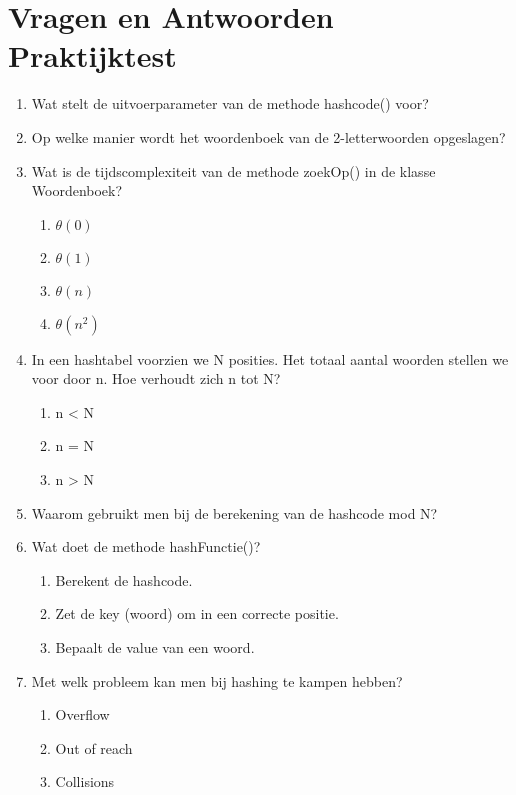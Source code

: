 
\chapter{Vragen en Antwoorden Praktijktest}
\label{ch:qenapraktijk}

\begin{enumerate}
	\item Wat stelt de uitvoerparameter van de methode  hashcode() voor?
	\item Op welke manier wordt het woordenboek van de 2-letterwoorden opgeslagen?
	\item Wat is de tijdscomplexiteit van de methode zoekOp() in de klasse Woordenboek?
	\begin{enumerate}
		\item $ \theta (0) $
		\item $ \theta (1) $
		\item $ \theta (n) $
		\item $ \theta ( n^2 ) $		
	\end{enumerate}
	\item In een hashtabel voorzien we N posities.  Het totaal aantal woorden stellen we voor door n.  Hoe verhoudt zich n tot N?
	\begin{enumerate}
		\item n < N
		\item n = N
		\item n > N		
	\end{enumerate}
	\item Waarom gebruikt men bij de berekening van de hashcode  mod N?
	\item Wat doet de methode hashFunctie()?
	\begin{enumerate}
		\item Berekent de hashcode.
		\item Zet de key (woord) om in een correcte positie.
		\item Bepaalt de value van een woord.	
	\end{enumerate}
	\item Met welk probleem kan men bij hashing te kampen hebben?
	\begin{enumerate}
		\item Overflow
		\item Out of reach
		\item Collisions	

\end{enumerate}
\end{enumerate}
